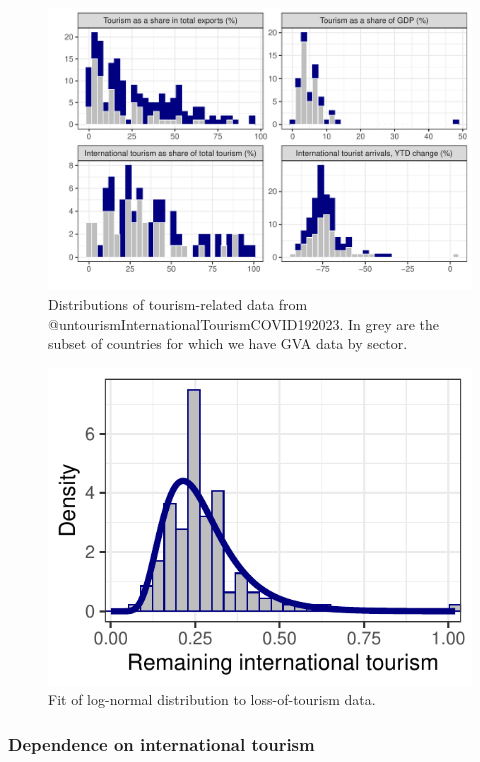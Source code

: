 \documentclass[
]{article}
\begin{document}
\begin{figure}

{\centering \includegraphics[width=0.5\linewidth]{README_files/figure-latex/tourismhist-1} 

}

\caption{Distributions of tourism-related data from @untourismInternationalTourismCOVID192023. In grey are the subset of countries for which we have GVA data by sector.}\label{fig:tourismhist}
\end{figure}

\begin{figure}

{\centering \includegraphics{README_files/figure-latex/ytd-1} 

}

\caption{Fit of log-normal distribution to loss-of-tourism data.}\label{fig:ytd}
\end{figure}

\newpage

\subsubsection{Dependence on international tourism}\label{dependence-on-international-tourism}
\end{document}
